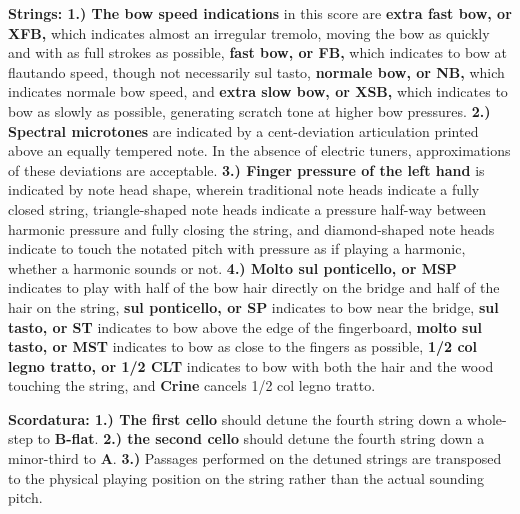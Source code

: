 \documentclass[11pt]{article}
\begin{document}
\begingroup
\textbf{Strings: 1.) The bow speed indications} in this score are \textbf{extra fast bow, or XFB,} which indicates almost an irregular tremolo, moving the bow as quickly and with as full strokes as possible,  \textbf{fast bow, or FB,} which indicates to bow at flautando speed, though not necessarily sul tasto, \textbf{normale bow, or NB,}  which indicates normale bow speed, and \textbf{extra slow bow, or XSB,} which indicates to bow as slowly as possible, generating scratch tone at higher bow pressures. \textbf{2.) Spectral microtones} are indicated by a cent-deviation articulation printed above an equally tempered note. In the absence of electric tuners, approximations of these deviations are acceptable. \textbf{3.) Finger pressure of the left hand} is indicated by note head shape, wherein traditional note heads indicate a fully closed string, triangle-shaped note heads indicate a pressure half-way between harmonic pressure and fully closing the string, and diamond-shaped note heads indicate to touch the notated pitch with pressure as if playing a harmonic, whether a harmonic sounds or not. \textbf{4.) Molto sul ponticello, or MSP} indicates to play with half of the bow hair directly on the bridge and half of the hair on the string, \textbf{sul ponticello, or SP} indicates to bow near the bridge, \textbf{sul tasto, or ST} indicates to bow above the edge of the fingerboard, \textbf{molto sul tasto, or MST} indicates to bow as close to the fingers as possible, \textbf{1/2 col legno tratto, or 1/2 CLT} indicates to bow with both the hair and the wood touching the string, and \textbf{Crine} cancels 1/2 col legno tratto.
\endgroup

\begingroup
\textbf{Scordatura: 1.) The first cello} should detune the fourth string down a whole-step to \textbf{B-flat}. \textbf{2.) the second cello} should detune the fourth string down a minor-third to \textbf{A}. \textbf{3.)} Passages performed on the detuned strings are transposed to the physical playing position on the string rather than the actual sounding pitch.
\endgroup
\end{document}
